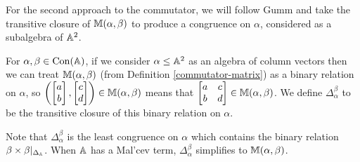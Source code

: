 \begin{appendices}

For the second approach to the commutator, we will follow Gumm \cite{gumm-geometric} and take the transitive closure of $\mathbb{M}(\alpha,\beta)$ to produce a congruence on $\alpha$, considered as a subalgebra of $\mathbb{A}^2$.

\begin{defn} For $\alpha,\beta \in \operatorname{Con}(\mathbb{A})$, if we consider $\alpha \le \mathbb{A}^2$ as an algebra of column vectors then we can treat $\mathbb{M}(\alpha,\beta)$ (from Definition \ref{commutator-matrix}) as a binary relation on $\alpha$, so $\left(\begin{bmatrix} a\\ b\end{bmatrix},\begin{bmatrix} c \\ d\end{bmatrix}\right) \in \mathbb{M}(\alpha,\beta)$ means that $\begin{bmatrix} a & c\\ b & d\end{bmatrix} \in \mathbb{M}(\alpha,\beta)$. We define $\Delta_\alpha^\beta$ to be the transitive closure of this binary relation on $\alpha$.
\end{defn}

Note that $\Delta_\alpha^\beta$ is the least congruence on $\alpha$ which contains the binary relation $\beta\times\beta|_{\Delta_{\mathbb{A}}}$. When $\mathbb{A}$ has a Mal'cev term, $\Delta_\alpha^\beta$ simplifies to $\mathbb{M}(\alpha,\beta)$.


\end{appendices}
